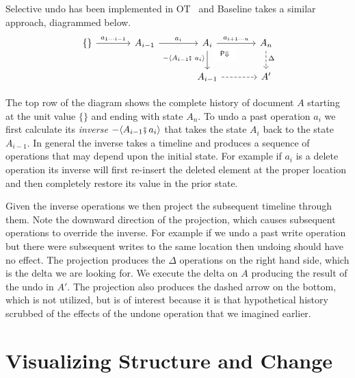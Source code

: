 \documentclass[english,submission]{programming}
\theoremstyle{definition}
\newcommand{\mathbox}[1]{\colorbox{black!10}{$#1$\phantom{i\hspace{-3.5pt}}}}
\begin{document}
Selective undo has been implemented in OT~\cite{sun00, weiss08} and Baseline takes a similar approach, diagrammed below.
\[\begin{tikzcd}[column sep=large]
	{\{\}} & {A_{i-1}} & {A_i} & {A_n} \\
	&& {A_{i-1}} & {A'}
	\arrow["{{{a_{1 \cdots i-1}}}}", from=1-1, to=1-2]
	\arrow["{{{a_i}}}", from=1-2, to=1-3]
	\arrow["{{{a_{i+1 \cdots n}}}}", from=1-3, to=1-4]
	\arrow["{{{- \langle A_{i-1}\fatsemi\  a_i \rangle}}}"'{pos=0.4}, from=1-3, to=2-3]
	\arrow["{{\begin{array}{c} \textsf{P}\Downarrow \end{array}}}"{description, pos=0.2}, draw=none, from=1-3, to=2-4]
	\arrow["{{{\Delta}}}"{pos=0.4}, dashed, from=1-4, to=2-4]
	\arrow[dashed, from=2-3, to=2-4]
\end{tikzcd}\]

The top row of the diagram shows the complete history of document \mathbox{A} starting at the unit value \mathbox{\{\}} and ending with state \mathbox{A_n}. To undo a past operation \mathbox{a_i} we first calculate its \textit{inverse} \mathbox{- \langle A_{i-1}\!\fatsemi a_i \rangle} that takes the state \mathbox{A_i} back to the state \mathbox{A_{i-1}}. In general the inverse takes a timeline and produces a sequence of operations that may depend upon the initial state. For example if \mathbox{a_i} is a \textsf{delete} operation its inverse will first re-insert the deleted element at the proper location and then completely restore its value in the prior state.

Given the inverse operations we then project the subsequent timeline through them. Note the downward direction of the projection, which causes subsequent operations to override the inverse. For example if we undo a past \textsf{write} operation but there were subsequent writes to the same location then undoing should have no effect. The projection produces the \mathbox{\Delta} operations on the right hand side, which is the delta we are looking for. We execute the delta on \mathbox{A} producing the result of the undo in \mathbox{A'}. The projection also produces the dashed arrow on the bottom, which is not utilized, but is of interest because it is that hypothetical history scrubbed of the effects of the undone operation that we imagined earlier.




\section{Visualizing Structure and Change}\label{UI}
\end{document}
